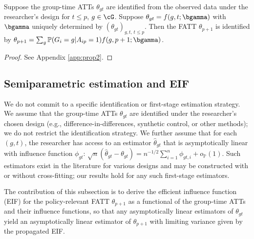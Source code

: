 \documentclass{article}
\renewcommand{\P}{\mathbb{P}}
\begin{document}
\begin{proposition}\label{prop:path2}
Suppose the group-time ATTs $\theta_{gt}$ are identified from the observed data under the researcher's design for $t \leq p$, $g \in \cG$. Suppose $\theta_{gt} = f(g,t;\bgamma)$ with $\bgamma$ uniquely determined by $(\theta_{gt})_{g,t,\, t \leq p}$. Then the FATT $\theta_{p+1}$ is identified by $\theta_{p+1} = \sum_{g}\P(G_i = g | A_{ip} = 1) f(g, p+1; \bgamma)$.
\end{proposition}

\begin{proof}
See Appendix \ref{app:prop2}.
\end{proof}

\subsection{Semiparametric estimation and EIF}
We do not commit to a specific identification or first-stage estimation strategy. We assume that the group-time ATTs $\theta_{gt}$ are identified under the researcher's chosen design (e.g., difference-in-differences, synthetic control, or other methods); we do not restrict the identification strategy. We further assume that for each $(g,t)$, the researcher has access to an estimator $\widehat{\theta}_{gt}$ that is asymptotically linear with influence function $\phi_{gt}$: $\sqrt{n}(\widehat{\theta}_{gt} - \theta_{gt}) = n^{-1/2}\sum_{i=1}^n \phi_{gt,i} + o_{\P}(1)$. Such estimators exist in the literature for various designs \citep{callawayDifferenceindifferencesMultipleTime2021} and may be constructed with or without cross-fitting; our results hold for any such first-stage estimators.

The contribution of this subsection is to derive the efficient influence function (EIF) for the policy-relevant FATT $\theta_{p+1}$ as a functional of the group-time ATTs and their influence functions, so that any asymptotically linear estimators of $\theta_{gt}$ yield an asymptotically linear estimator of $\theta_{p+1}$ with limiting variance given by the propagated EIF.
\end{document}

